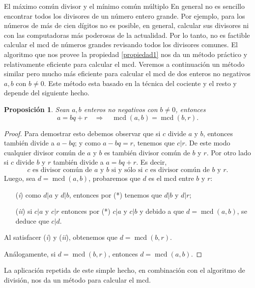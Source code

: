 \documentclass[11pt,spanish,makeidx]{amsbook}
\newtheorem{proposicion}[teorema]{Proposici\'on}
\theoremstyle{definition}
\theoremstyle{remark}
\newcommand \mcd{\operatorname{mcd}}
\begin{document}
\begin{section}{El máximo común divisor y el mínimo común múltiplo}
En  general no es sencillo encontrar todos los divisores de un número entero grande. Por ejemplo, para los  números de más de cien dígitos no es posible,  en general, calcular sus divisores ni con las computadoras más poderosas de la actualidad. Por  lo tanto, no es factible calcular el  mcd de números grandes revisando todos los divisores comunes.  El algoritmo que nos provee la  propiedad \ref{propiedad1} nos da un método práctico y relativamente eficiente para calcular el mcd. Veremos a continuación un método similar pero mucho más eficiente para calcular el mcd de dos enteros no negativos $a,b$ con $b \not=0$. Este método esta basado en la técnica del cociente y el resto y depende del siguiente hecho.

\begin{proposicion}\label{prop-alg-eucl} Sean  $a,b$ enteros no negativos con $b \not=0$, entonces 
\begin{equation}\label{bec}
a=bq+r\quad \Rightarrow \quad\mcd(a,b)=\mcd(b,r).
\end{equation}
\end{proposicion}
\begin{proof}
Para demostrar esto debemos observar que si $c$ divide $a$ y $b$, entonces también divide a $a-bq$; y como $a-bq=r$, tenemos que $c|r$. De este modo cualquier divisor común de $a$ y $b$ es también divisor común de $b$ y $r$.  Por otro lado si $c$ divide $b$ y $r$ también divide a $a=bq+r$. Es decir, 
\begin{equation}\label{eqmcd1}
\text{$c$ es divisor común de $a$ y $b$ si y sólo si $c$ es divisor común de $b$ y $r$.} \tag{*}
\end{equation}
Luego, sea $d = \mcd(a,b)$, probaremos que $d$ es el mcd entre $b$ y $r$:
\begin{enumerate}
\item[({\em i})] como $d|a$ y $d|b$, entonces por (*) tenemos que $ d|b$ y $d|r$;
\item[({\em ii})] si $c|a $ y $c|r$ entonces por (*)  $c|a$ y $c|b$ y debido a que $d = \mcd(a,b)$, se deduce que $c|d$.
\end{enumerate}
Al satisfacer ({\em i}) y ({\em ii}), obtenemos que $d = \mcd(b,r)$.

Análogamente, si $d = \mcd(b,r)$, entonces  $d = \mcd(a,b)$.
\end{proof}

La aplicación repetida de este simple hecho, en combinación con el algoritmo de división, nos da un método para calcular el mcd.


\end{section}
\end{document}
